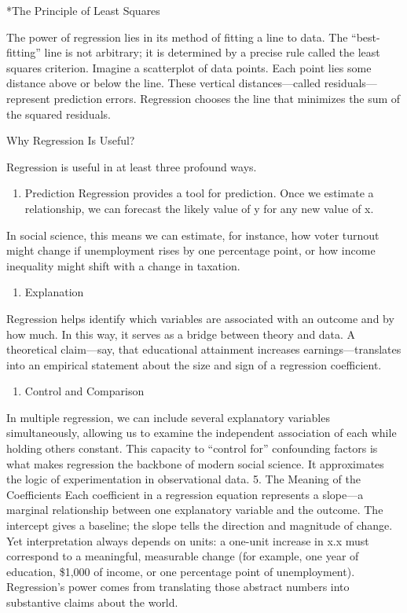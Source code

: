 \documentclass[
  letterpaper,
  DIV=11,
  numbers=noendperiod]{scrreprt}
\providecommand{\tightlist}{%
  \setlength{\itemsep}{0pt}\setlength{\parskip}{0pt}}
\begin{document}
*The Principle of Least Squares

The power of regression lies in its method of fitting a line to data.
The ``best-fitting'' line is not arbitrary; it is determined by a
precise rule called the least squares criterion. Imagine a scatterplot
of data points. Each point lies some distance above or below the line.
These vertical distances---called residuals---represent prediction
errors. Regression chooses the line that minimizes the sum of the
squared residuals.

Why Regression Is Useful?

Regression is useful in at least three profound ways.

\begin{enumerate}
\def\labelenumi{(\alph{enumi})}
\tightlist
\item
  Prediction Regression provides a tool for prediction. Once we estimate
  a relationship, we can forecast the likely value of y for any new
  value of x.
\end{enumerate}

In social science, this means we can estimate, for instance, how voter
turnout might change if unemployment rises by one percentage point, or
how income inequality might shift with a change in taxation.

\begin{enumerate}
\def\labelenumi{(\alph{enumi})}
\setcounter{enumi}{1}
\tightlist
\item
  Explanation
\end{enumerate}

Regression helps identify which variables are associated with an outcome
and by how much. In this way, it serves as a bridge between theory and
data. A theoretical claim---say, that educational attainment increases
earnings---translates into an empirical statement about the size and
sign of a regression coefficient.

\begin{enumerate}
\def\labelenumi{(\alph{enumi})}
\setcounter{enumi}{2}
\tightlist
\item
  Control and Comparison
\end{enumerate}

In multiple regression, we can include several explanatory variables
simultaneously, allowing us to examine the independent association of
each while holding others constant. This capacity to ``control for''
confounding factors is what makes regression the backbone of modern
social science. It approximates the logic of experimentation in
observational data. 5. The Meaning of the Coefficients Each coefficient
in a regression equation represents a slope---a marginal relationship
between one explanatory variable and the outcome. The intercept gives a
baseline; the slope tells the direction and magnitude of change. Yet
interpretation always depends on units: a one-unit increase in x.x must
correspond to a meaningful, measurable change (for example, one year of
education, \$1,000 of income, or one percentage point of unemployment).
Regression's power comes from translating those abstract numbers into
substantive claims about the world.
\end{document}
